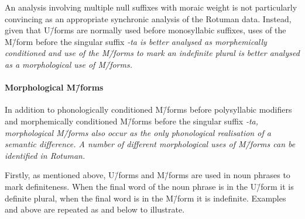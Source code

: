 \begin{exe}
\label{ex:RotExcShoFor}
\end{exe}

An analysis involving multiple null suffixes with moraic weight
is not particularly convincing as an appropriate synchronic analysis of the Rotuman data.
Instead, given that U\=/forms are normally used before monosyllabic suffixes,
uses of the M\=/form before the singular suffix \it{-ta}
is better analysed as morphemically conditioned
and use of the M\=/forms to mark an indefinite plural is better
analysed as a morphological use of M\=/forms.

\paragraph{Morphological M\=/forms}\label{sec:RotMorMfo}
In addition to phonologically conditioned M\=/forms before polysyllabic modifiers
and morphemically conditioned M\=/forms before the singular suffix \it{-ta},
morphological M\=/forms also occur
as the only phonological realisation of a semantic difference.
A number of different morphological uses of M\=/forms can be identified in Rotuman.

Firstly, as mentioned above,
U\=/forms and M\=/forms are used in noun phrases to mark definiteness.
When the final word of the noun phrase is in the U\=/form it is definite plural,
when the final word is in the M\=/form it is indefinite.
Examples and  above
are repeated as  and  below to illustrate.

\begin{multicols}{2}
	\begin{exe}\let\eachwordone=\itshape
		\label{ex2:RotDef}
		\label{ex2:RotInd}
	\end{exe}
\end{multicols}

